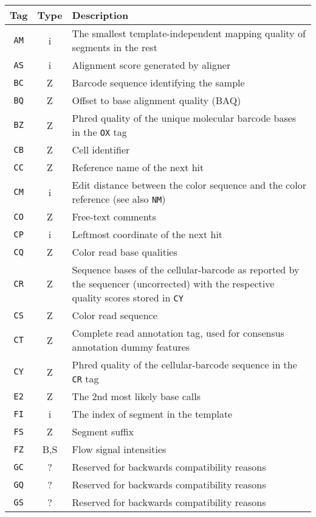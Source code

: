 \documentclass[10pt]{article}
\begin{document}
\begin{center}\small
\begin{longtable}{ccp{12.5cm}}
  \hline
  {\bf Tag} & {\bf Type} & {\bf Description} \\
  \hline
  {\tt AM} & i & The smallest template-independent mapping quality of segments in the rest \\
  {\tt AS} & i & Alignment score generated by aligner \\
  {\tt BC} & Z & Barcode sequence identifying the sample \\
  {\tt BQ} & Z & Offset to base alignment quality (BAQ) \\
  {\tt BZ} & Z & Phred quality of the unique molecular barcode bases in the {\tt OX} tag \\
  {\tt CB} & Z & Cell identifier \\
  {\tt CC} & Z & Reference name of the next hit \\
  {\tt CM} & i & Edit distance between the color sequence and the color reference (see also {\tt NM}) \\
  {\tt CO} & Z & Free-text comments \\
  {\tt CP} & i & Leftmost coordinate of the next hit \\
  {\tt CQ} & Z & Color read base qualities \\
  {\tt CR} & Z & Sequence bases of the cellular-barcode as reported by the sequencer (uncorrected) with the respective quality scores stored in {\tt CY}\\
  {\tt CS} & Z & Color read sequence \\
  {\tt CT} & Z & Complete read annotation tag, used for consensus annotation dummy features \\
  {\tt CY} & Z & Phred quality of the cellular-barcode sequence in the {\tt CR} tag \\
  {\tt E2} & Z & The 2nd most likely base calls \\
  {\tt FI} & i & The index of segment in the template \\
  {\tt FS} & Z & Segment suffix \\
  {\tt FZ} & B,S & Flow signal intensities \\
  {\tt GC} & ? & Reserved for backwards compatibility reasons \\
  {\tt GQ} & ? & Reserved for backwards compatibility reasons \\
  {\tt GS} & ? & Reserved for backwards compatibility reasons \\

\end{longtable}
\end{center}
\end{document}
